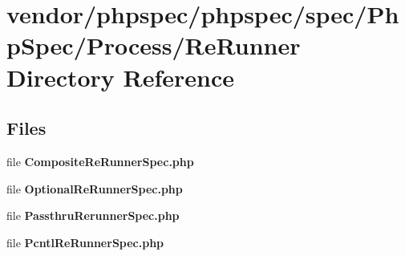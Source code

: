 \section{vendor/phpspec/phpspec/spec/\+Php\+Spec/\+Process/\+Re\+Runner Directory Reference}
\label{dir_61f2a6834864533f2b6652fa77334d93}
\subsection*{Files}
\begin{DoxyCompactItemize}
\item 
file {\bf Composite\+Re\+Runner\+Spec.\+php}
\item 
file {\bf Optional\+Re\+Runner\+Spec.\+php}
\item 
file {\bf Passthru\+Rerunner\+Spec.\+php}
\item 
file {\bf Pcntl\+Re\+Runner\+Spec.\+php}
\end{DoxyCompactItemize}
